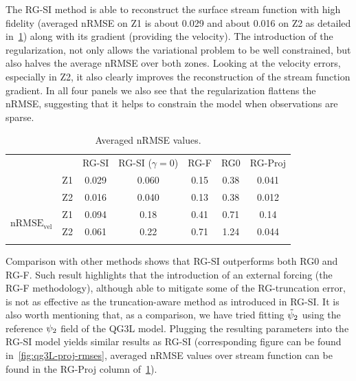 \documentclass[
  draft
]{agujournal2025}
\begin{document}
The RG-SI method is able to reconstruct the surface stream function with high fidelity (averaged nRMSE on Z1 is about 0.029 and about 0.016 on Z2 as detailed in~\cref{tab:qg3l-nrmses}) along with its gradient (providing the velocity). The introduction of the regularization, not only allows the variational problem to be well constrained, but also halves the average nRMSE over both zones. Looking at the velocity errors, especially in Z2, it also clearly improves the reconstruction of the stream function gradient. In all four panels we also see that the regularization flattens the nRMSE, suggesting that it helps to constrain the model when observations are sparse.

\begin{table}[h]
    \begin{center}
        \begin{tabular}{clccccc}
            & & RG-SI & RG-SI ($\gamma = 0$) & RG-F & RG0 & RG-Proj\\
            \savehline
                \multirow{2}{*}{nRMSE} &\multicolumn{1}{l}{Z1} & 0.029 & 0.060 & 0.15 & 0.38 & 0.041 \\
                &\multicolumn{1}{l}{Z2} & 0.016 & 0.040 & 0.13 & 0.38 & 0.012\\
                \multirow{2}{*}{$\mathrm{nRMSE}_{\mathrm{vel}}$} & \multicolumn{1}{l}{Z1} & 0.094 & 0.18 & 0.41 & 0.71 & 0.14 \\
                & \multicolumn{1}{l}{Z2} & 0.061 & 0.22 & 0.71 & 1.24 & 0.044\\
            \savehline \\
        \end{tabular}
    \end{center}
    \caption{Averaged nRMSE values.}\label{tab:qg3l-nrmses}
\end{table}

Comparison with other methods shows that RG-SI outperforms both RG0 and RG-F.
Such result highlights that the introduction of an external forcing (the RG-F methodology), although able to mitigate some of the RG-truncation error, is not as effective as the truncation-aware method as introduced in RG-SI.
It is also worth mentioning that, as a comparison, we have tried fitting $\tilde{\sf}_2$ using the reference $\sf_2$ field of the QG3L model. Plugging the resulting parameters into the RG-SI model yields similar results as RG-SI (corresponding figure can be found in~\cref{fig:qg3L-proj-rmses}, averaged nRMSE values over stream function can be found in the RG-Proj column of~\cref{tab:qg3l-nrmses}).
\end{document}
